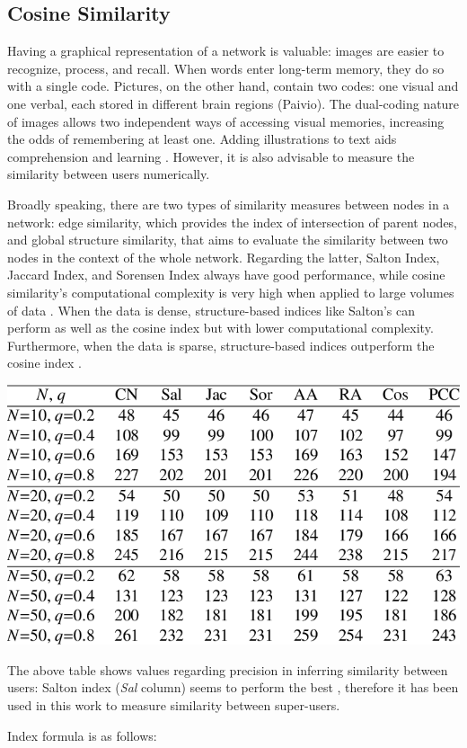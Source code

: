 \subsection{Cosine Similarity}

Having a graphical representation of a network is valuable: images are easier to recognize, process, and recall. When words enter long-term memory, they do so with a single code. Pictures, on the other hand, contain two codes: one visual and one verbal, each stored in different brain regions (Paivio). The dual-coding nature of images allows two independent ways of accessing visual memories, increasing the odds of remembering at least one. Adding illustrations to text aids comprehension and learning \cite{10.21083/partnership.v10i1.3137}. However, it is also advisable to measure the similarity between users numerically.

Broadly speaking, there are two types of similarity measures between nodes in a network: edge similarity, which provides the index of intersection of parent nodes, and global structure similarity, that aims to evaluate the similarity between two nodes in the context of the whole network. Regarding the latter, Salton Index, Jaccard Index, and Sorensen Index always have good performance, while cosine similarity's computational complexity is very high when applied to large volumes of data \cite{smilarityMeasuresSurvey}. When the data is dense, structure-based indices like Salton's can perform as well as the cosine index but with lower computational complexity. Furthermore, when the data is sparse, structure-based indices outperform the cosine index \cite{10.1016/j.phpro.2010.07.033}.

\aCapo{}
\includegraphics[width = .5\textwidth]{images/salton_precision.png}

The above table shows values regarding precision in inferring similarity between users: Salton index (\textit{Sal} column) seems to perform the best \cite{10.1016/j.phpro.2010.07.033}, therefore it has been used in this work to measure similarity between super-users.

Index formula is as follows: 

